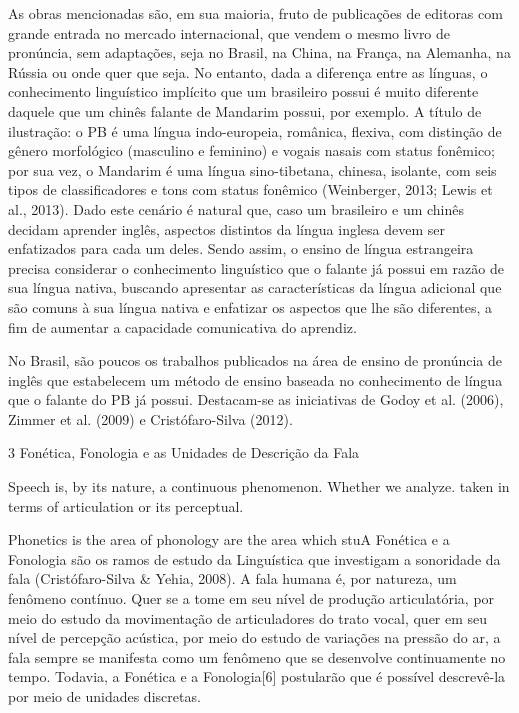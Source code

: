 As obras mencionadas s\~ao, em sua  maioria,  fruto  de  publica\c{c}\~oes  de
editoras com grande entrada no mercado internacional, que vendem o mesmo
livro de pron\'uncia, sem adapta\c{c}\~oes, seja no Brasil, na China, na Fran\c{c}a,
na Alemanha, na R\'ussia ou onde quer que seja. No entanto, dada a
diferen\c{c}a entre as l\'inguas, o conhecimento lingu\'istico impl\'icito que um
brasileiro possui \'e muito diferente daquele que um chin\^es falante de
Mandarim possui, por exemplo. A t\'itulo de ilustra\c{c}\~ao: o PB \'e uma l\'ingua
indo-europeia, rom\^anica, flexiva, com distin\c{c}\~ao de g\^enero morfol\'ogico
(masculino e feminino) e vogais nasais com status fon\^emico; por sua vez,
o Mandarim \'e uma l\'ingua sino-tibetana, chinesa, isolante, com seis tipos
de classificadores e tons com status fon\^emico (Weinberger, 2013; Lewis
et al., 2013). Dado este cen\'ario \'e natural que, caso um brasileiro e um
chin\^es decidam aprender ingl\^es, aspectos distintos da l\'ingua inglesa
devem ser enfatizados para cada um deles. Sendo assim, o ensino de
l\'ingua estrangeira precisa considerar o conhecimento lingu\'istico que o
falante j\'a possui em raz\~ao de sua l\'ingua nativa, buscando apresentar as
caracter\'isticas da l\'ingua adicional que s\~ao comuns à sua l\'ingua nativa e
enfatizar os aspectos que lhe s\~ao diferentes, a fim de aumentar a
capacidade comunicativa do aprendiz.

No Brasil, s\~ao poucos os trabalhos publicados na  \'area  de  ensino  de
pron\'uncia de ingl\^es que estabelecem um m\'etodo de ensino baseada no
conhecimento de l\'ingua que o falante do PB j\'a possui. Destacam-se as
iniciativas de Godoy et al. (2006), Zimmer et al. (2009) e
Crist\'ofaro-Silva (2012).

3 Fon\'etica, Fonologia e as Unidades de Descri\c{c}\~ao da Fala

Speech is, by its nature, a continuous phenomenon. Whether we analyze. taken in terms of articulation or its perceptual. 


Phonetics is the area of  phonology are the area which stuA Fon\'etica e a Fonologia s\~ao os ramos de estudo da Lingu\'istica que
investigam a sonoridade da fala (Crist\'ofaro-Silva \& Yehia, 2008). A
fala humana \'e, por natureza, um fen\^omeno cont\'inuo. Quer se a tome em seu
n\'ivel de produ\c{c}\~ao articulat\'oria, por meio do estudo da movimenta\c{c}\~ao de
articuladores do trato vocal, quer em seu n\'ivel de percep\c{c}\~ao ac\'ustica,
por meio do estudo de varia\c{c}\~oes na press\~ao do ar, a fala sempre se
manifesta como um fen\^omeno que se desenvolve continuamente no tempo.
Todavia, a Fon\'etica e a Fonologia{[}6{]} postular\~ao que \'e poss\'ivel
descrev\^e-la por meio de unidades discretas.

